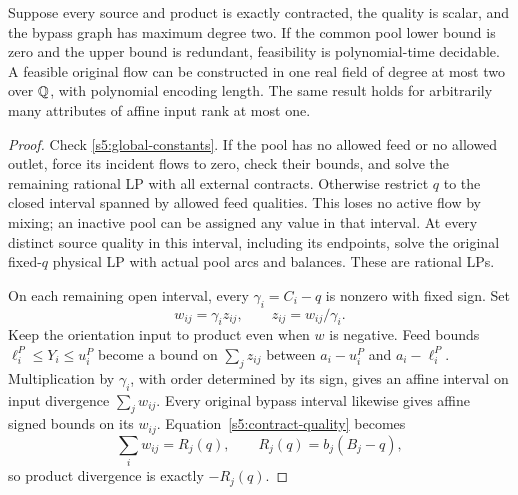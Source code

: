 \begin{theorem}\label{s5:quadratic-field}
Suppose every source and product is exactly contracted, the quality is
scalar, and the bypass graph has maximum degree two. If the common pool
lower bound is zero and the upper bound is redundant, feasibility is
polynomial-time decidable. A feasible original flow can be constructed
in one real field of degree at most two over $\mathbb Q$, with polynomial
encoding length. The same result holds for arbitrarily many attributes
of affine input rank at most one.
\end{theorem}
\begin{proof}
Check \eqref{s5:global-constants}. If the pool has no allowed feed or no
allowed outlet, force its incident flows to zero, check their bounds,
and solve the remaining rational LP with all external contracts. Otherwise
restrict $q$ to the closed interval spanned by allowed feed qualities.
This loses no active flow by mixing; an inactive pool can be assigned
any value in that interval. At every distinct source quality in this
interval, including its endpoints, solve the original fixed-$q$ physical
LP with actual pool arcs and balances. These are rational LPs.

On each remaining open interval, every $\gamma_i=C_i-q$ is nonzero
with fixed sign. Set
\begin{equation}
 w_{ij}=\gamma_i z_{ij},\qquad z_{ij}=w_{ij}/\gamma_i.
 \label{s5:scaling}
\end{equation}
Keep the orientation input to product even when $w$ is negative. Feed
bounds $\ell_i^P\le Y_i\le u_i^P$ become a bound on
$\sum_jz_{ij}$ between $a_i-u_i^P$ and $a_i-\ell_i^P$. Multiplication
by $\gamma_i$, with order determined by its sign, gives an affine
interval on input divergence $\sum_jw_{ij}$. Every original bypass
interval likewise gives affine signed bounds on its $w_{ij}$.
Equation~\eqref{s5:contract-quality} becomes
\begin{equation}
 \sum_i w_{ij}=R_j(q),\qquad R_j(q)=b_j(B_j-q),
 \label{s5:output-divergence}
\end{equation}
so product divergence is exactly $-R_j(q)$.


\end{proof}
